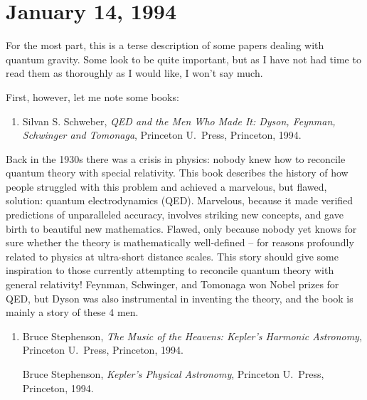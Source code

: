 \documentclass{article}
\def\tightlist{}
\begin{document}
\hypertarget{week30}{%
\section{January 14, 1994}\label{week30}}

For the most part, this is a terse description of some papers dealing
with quantum gravity. Some look to be quite important, but as I have not
had time to read them as thoroughly as I would like, I won't say much.

First, however, let me note some books:

\begin{enumerate}
\def\labelenumi{\arabic{enumi})}
\tightlist
\item
   Silvan S. Schweber, \emph{QED and the Men Who Made It: Dyson, Feynman, Schwinger and
  Tomonaga}, Princeton U.\ Press, Princeton, 1994.
\end{enumerate}

Back in the 1930s there was a crisis in physics: nobody knew how to
reconcile quantum theory with special relativity. This book describes
the history of how people struggled with this problem and achieved a
marvelous, but flawed, solution: quantum electrodynamics (QED).
Marvelous, because it made verified predictions of unparalleled
accuracy, involves striking new concepts, and gave birth to beautiful
new mathematics. Flawed, only because nobody yet knows for sure whether
the theory is mathematically well-defined -- for reasons profoundly
related to physics at ultra-short distance scales. This story should
give some inspiration to those currently attempting to reconcile quantum
theory with general relativity! Feynman, Schwinger, and Tomonaga won
Nobel prizes for QED, but Dyson was also instrumental in inventing the
theory, and the book is mainly a story of these 4 men.

\begin{enumerate}
\def\labelenumi{\arabic{enumi})}
\setcounter{enumi}{1}
\item
  Bruce Stephenson, \emph{The Music of the Heavens: Kepler's Harmonic Astronomy},  
  Princeton U.\ Press, Princeton, 1994.

   Bruce Stephenson, \emph{Kepler's Physical Astronomy}, Princeton U.\
  Press, Princeton, 1994.
\end{enumerate}
\end{document}
